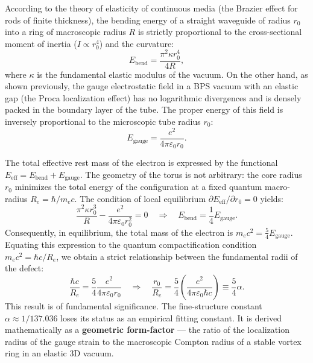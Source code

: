 \documentclass[12pt,a4paper]{article}
\begin{document}
According to the theory of elasticity of continuous media (the Brazier effect for rods of finite thickness), the bending energy of a straight waveguide of radius $r_0$ into a ring of macroscopic radius $R$ is strictly proportional to the cross-sectional moment of inertia ($I \propto r_0^4$) and the curvature:
\begin{equation}
	E_{\text{bend}} = \frac{\pi^2 \kappa r_0^4}{4R},
\end{equation}
where $\kappa$ is the fundamental elastic modulus of the vacuum. 
On the other hand, as shown previously, the gauge electrostatic field in a BPS vacuum with an elastic gap (the Proca localization effect) has no logarithmic divergences and is densely packed in the boundary layer of the tube. The proper energy of this field is inversely proportional to the microscopic tube radius $r_0$:
\begin{equation}
	E_{\text{gauge}} = \frac{e^2}{4\pi\varepsilon_0 r_0}.
\end{equation}

The total effective rest mass of the electron is expressed by the functional $E_{\text{eff}} = E_{\text{bend}} + E_{\text{gauge}}$. The geometry of the torus is not arbitrary: the core radius $r_0$ minimizes the total energy of the configuration at a fixed quantum macro-radius $R_e = \hbar / m_e c$.
The condition of local equilibrium $\partial E_{\text{eff}} / \partial r_0 = 0$ yields:
\begin{equation}
	\frac{\pi^2 \kappa r_0^3}{R} - \frac{e^2}{4\pi\varepsilon_0 r_0^2} = 0 \quad \Longrightarrow \quad E_{\text{bend}} = \frac{1}{4} E_{\text{gauge}}.
\end{equation}
Consequently, in equilibrium, the total mass of the electron is $m_e c^2 = \frac{5}{4} E_{\text{gauge}}$. Equating this expression to the quantum compactification condition $m_e c^2 = \hbar c / R_e$, we obtain a strict relationship between the fundamental radii of the defect:
\begin{equation}
	\frac{\hbar c}{R_e} = \frac{5}{4} \frac{e^2}{4\pi\varepsilon_0 r_0} \quad \Longrightarrow \quad \frac{r_0}{R_e} = \frac{5}{4} \left( \frac{e^2}{4\pi\varepsilon_0 \hbar c} \right) \equiv \frac{5}{4} \alpha.
\end{equation}
This result is of fundamental significance. The fine-structure constant $\alpha \approx 1/137.036$ loses its status as an empirical fitting constant. It is derived mathematically as a \textbf{geometric form-factor} — the ratio of the localization radius of the gauge strain to the macroscopic Compton radius of a stable vortex ring in an elastic 3D vacuum.
\end{document}
